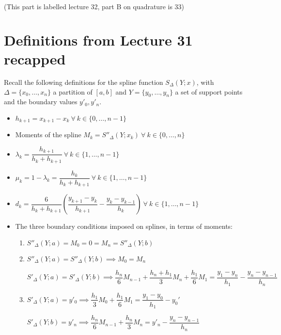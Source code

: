 
(This part is labelled lecture 32, part B on quadrature is 33)
\section{Definitions from Lecture 31 recapped}

Recall the following definitions for the spline function $ S_\Delta(Y;x) $, with $ \Delta = \{x_0, \dots, x_n\} $ a partition of $ [a,b] $ and $ Y = \{y_0, \dots, y_n\} $ a set of support points and the boundary values $ y'_0, y'_n $.

\begin{defn}
	\phantom{a} \msk
	\begin{itemize}
	\item $ h_{k+1} = x_{k+1} - x_k \ \forall \ k \in \{0, \dots, n-1\} $ 
	\msk
	
	\item Moments of the spline $ M_k = S''_\Delta(Y;x_k) \ \forall \ k \in \{0, \dots, n\} $
	\msk
	
	\item $ \lambda_k = \dfrac{h_{k+1}}{h_k + h_{k+1}} \ \forall \ k \in \{1, \dots, n-1\}$
	\msk
	
	\item $ \mu_k = 1 - \lambda_k = \dfrac{h_{k}}{h_k + h_{k+1}} \ \forall \ k \in \{1, \dots, n-1\}$
	\msk
	
	\item $ d_k = \dfrac{6}{h_k + h_{k+1}}\left(\dfrac{y_{k+1}-y_k}{h_{k+1}} - \dfrac{y_k - y_{k-1}}{h_k} \right) \ \forall \ k \in \{1, \dots, n-1\}$
	\msk
	
	\item The three boundary conditions imposed on splines, in terms of moments:
	\ssk
		\begin{enumerate}[label=Case (\alph*):]
		\item $ S''_\Delta(Y;a) = M_0 = 0 = M_n = S''_\Delta(Y;b) $
		\msk
		
		\item $ S''_\Delta(Y;a) = S''_\Delta(Y;b) \implies M_0 = M_n $ \ssk
		
		$ S'_\Delta(Y;a) = S'_\Delta(Y;b) \implies \dfrac{h_n}{6}M_{n-1} + \dfrac{h_n + h_1}{3}M_n + \dfrac{h_1}{6}M_1 = \dfrac{y_1-y_n}{h_1} - \dfrac{y_n-y_{n-1}}{h_n}$
		\ssk
		
		\item $ S'_\Delta(Y;a) = y'_0 \implies \dfrac{h_1}{3}M_0 + \dfrac{h_1}{6}M_1 = \dfrac{y_1-y_0}{h_1}-y_0' $ \ssk
		
		$ S'_\Delta(Y;b) = y'_n \implies \dfrac{h_n}{6}M_{n-1} + \dfrac{h_n}{3}M_n = y'_n - \dfrac{y_n-y_{n-1}}{h_n} $
		\end{enumerate}
	\end{itemize}
\end{defn}

